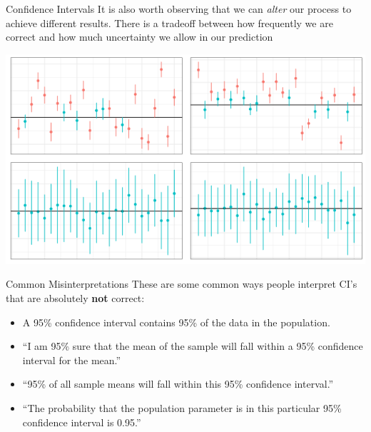 \documentclass{beamer}
\begin{document}
\begin{frame}{Confidence Intervals}
\footnotesize
It is also worth observing that we can \textit{alter} our process to achieve different results. There is a tradeoff between how frequently we are correct and how much uncertainty we allow in our prediction

\begin{center}
\includegraphics[scale=0.5]{diff_band.png}
\end{center}
\end{frame}

\begin{frame}{Common Misinterpretations}
These are some common ways people interpret CI's that are absolutely \textbf{not} correct: \vspace{2mm}
\begin{itemize}
    \item A 95\% confidence interval contains 95\% of the data in the population. \vspace{2mm}
    \item “I am 95\% sure that the mean of the sample will fall within a 95\% confidence interval for the mean.” \vspace{2mm}
    \item “95\% of all sample means will fall within this 95\% confidence interval.” \vspace{2mm}
    \item “The probability that the population parameter is in this particular 95\% confidence interval is 0.95.” \vspace{2mm}

\end{itemize}
\end{frame}
\end{document}
